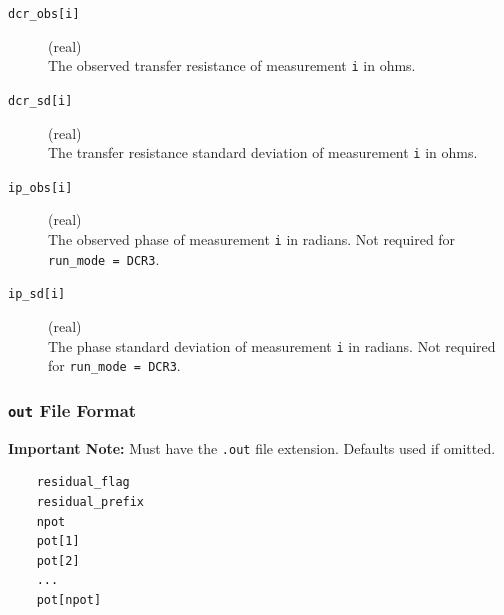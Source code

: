 \documentclass[a4paper,12pt]{article}
\begin{document}
\begin{description}
    \item[\texttt{dcr\_obs[i]}] (real)\hfill \\
          The observed transfer resistance of measurement \texttt{i} in ohms.

    \item[\texttt{dcr\_sd[i]}] (real)\hfill \\
          The transfer resistance standard deviation of measurement \texttt{i} in ohms.

    \item[\texttt{ip\_obs[i]}] (real)\hfill \\
          The observed phase of measurement \texttt{i} in radians. Not required for \texttt{run\_mode = DCR3}.

    \item[\texttt{ip\_sd[i]}] (real)\hfill \\
          The phase standard deviation of measurement \texttt{i} in radians. Not required for \texttt{run\_mode = DCR3}.
\end{description}

\newpage
\subsubsection{\texttt{out} File Format} \label{inversion_out}

\begin{framed}
    \noindent \textbf{Important Note:} Must have the \texttt{.out} file extension. Defaults used if omitted.
\end{framed}

\begin{framed}
    \begin{verbatim}
    residual_flag
    residual_prefix
    npot
    pot[1]
    pot[2]
    ...
    pot[npot]
\end{verbatim}
\end{framed}
\end{document}
